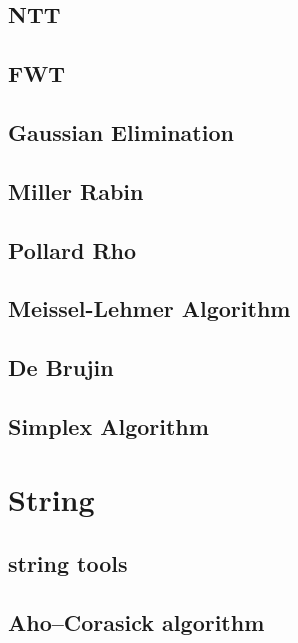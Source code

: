 \documentclass[a4paper,10pt,twocolumn,oneside]{article}
\begin{document}
\subsection{NTT}


\subsection{FWT}


\subsection{Gaussian Elimination}


\subsection{Miller Rabin}


\subsection{Pollard Rho}


\subsection{Meissel-Lehmer Algorithm}


\subsection{De Brujin}


\subsection{Simplex Algorithm}


\section{String}
\subsection{string tools}


\subsection{Aho–Corasick algorithm}

\end{document}
